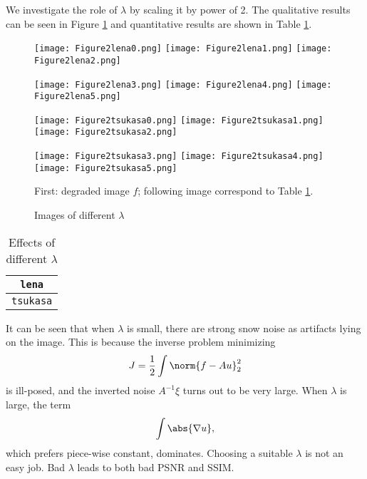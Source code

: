 \documentclass[english, nochinese]{pnote}
\begin{document}
We investigate the role of $\lambda$ by scaling it by power of 2. The qualitative results can be seen in Figure \ref{Fig:Lambda} and quantitative results are shown in Table \ref{Tbl:Lambda}.

\begin{figure}[htb]
{
\centering

\texttt{[image: Figure2lena0.png]}
\texttt{[image: Figure2lena1.png]}
\texttt{[image: Figure2lena2.png]}

\texttt{[image: Figure2lena3.png]}
\texttt{[image: Figure2lena4.png]}
\texttt{[image: Figure2lena5.png]}

\texttt{[image: Figure2tsukasa0.png]}
\texttt{[image: Figure2tsukasa1.png]}
\texttt{[image: Figure2tsukasa2.png]}

\texttt{[image: Figure2tsukasa3.png]}
\texttt{[image: Figure2tsukasa4.png]}
\texttt{[image: Figure2tsukasa5.png]}

\caption{Images of different $\lambda$}
\label{Fig:Lambda}
}
{
\footnotesize First: degraded image $f$; following image correspond to Table \ref{Tbl:Lambda}.
}
\end{figure}

\begin{table}[htb]
\centering
\begin{tabular}{|c|c|c|c|c|c|c|}
\hline
\multicolumn{7}{|c|}{\texttt{lena}} \\
\hline

\multicolumn{7}{|c|}{\texttt{tsukasa}} \\
\hline

\end{tabular}
\caption{Effects of different $\lambda$}
\label{Tbl:Lambda}
\end{table}

It can be seen that when $\lambda$ is small, there are strong snow noise as artifacts lying on the image. This is because the inverse problem minimizing
\begin{equation}
J = \frac{1}{2} \int \norm{ f - A u }_2^2
\end{equation}
is ill-posed, and the inverted noise $ A^{-1} \xi $ turns out to be very large. When $\lambda$ is large, the term
\begin{equation}
\int \abs{ \nabla u },
\end{equation}
which prefers piece-wise constant, dominates. Choosing a suitable $\lambda$ is not an easy job. Bad $\lambda$ leads to both bad PSNR and SSIM.
\end{document}
